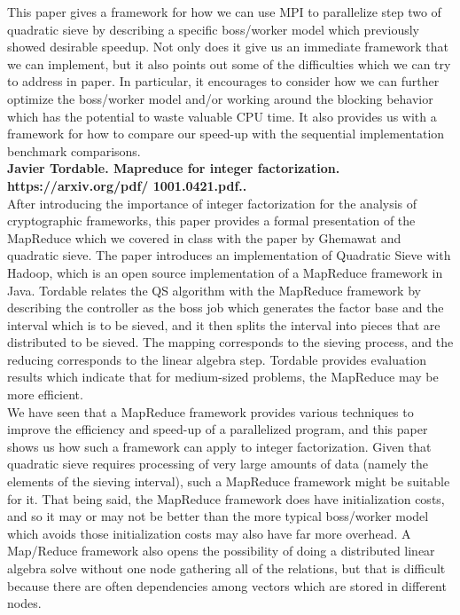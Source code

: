 \documentclass[11pt,twocolumn]{article}
\begin{document}
This paper gives a framework for how we can use MPI to parallelize step two of quadratic sieve by describing a specific boss/worker model which previously showed desirable speedup. Not only does it give us an immediate framework that we can implement, but it also points out some of the difficulties which we can try to address in paper. In particular, it encourages to consider how we can further optimize the boss/worker model and/or working around the blocking behavior which has the potential to waste valuable CPU time. It also provides us with a framework for how to compare our speed-up with the sequential implementation benchmark comparisons. \\

\textbf{Javier Tordable. Mapreduce for integer
factorization.
https://arxiv.org/pdf/
1001.0421.pdf..} \\

After introducing the importance of integer factorization for the analysis of cryptographic frameworks, this paper provides a formal presentation of the MapReduce which we covered in class with the paper by Ghemawat and quadratic sieve. The paper introduces an implementation of Quadratic Sieve with Hadoop, which is an open source implementation of a MapReduce framework in Java. Tordable relates the QS algorithm with the MapReduce framework by describing the controller as the boss job which generates the factor base and the interval which is to be sieved, and it then splits the interval into pieces that are distributed to be sieved. The mapping corresponds to the sieving process, and the reducing corresponds to the linear algebra step. Tordable provides evaluation results which indicate that for medium-sized problems, the MapReduce may be more efficient. \\
\indent We have seen that a MapReduce framework provides various techniques to improve the efficiency and speed-up of a parallelized program, and this paper shows us how such a framework can apply to integer factorization. Given that quadratic sieve requires processing of very large amounts of data (namely the elements of the sieving interval), such a MapReduce framework might be suitable for it. That being said, the MapReduce framework does have initialization costs, and so it may or may not be better than the more typical boss/worker model which avoids those initialization costs may also have far more overhead. A Map/Reduce framework also opens the possibility of doing a distributed linear algebra solve without one node gathering all of the relations, but that is difficult because there are often dependencies among vectors which are stored in different nodes. \\
\end{document}
